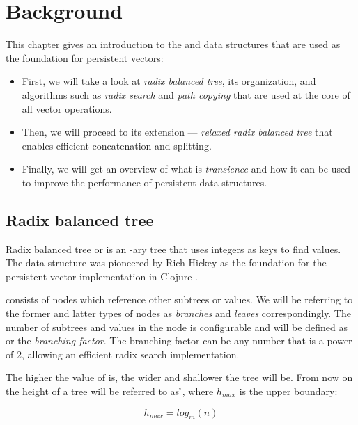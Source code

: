 \chapter{Background}

This chapter gives an introduction to the \treerb{} and \treerrb{} data structures that are used as the foundation for persistent vectors:

\begin{itemize}
    \item First, we will take a look at \emph{radix balanced tree}, its organization, and algorithms such as \emph{radix search} and \emph{path copying} that are used at the core of all vector operations.
    \item Then, we will proceed to its extension --- \emph{relaxed radix balanced tree} that enables efficient concatenation and splitting.
    \item Finally, we will get an overview of what is \emph{transience} and how it can be used to improve the performance of persistent data structures.
\end{itemize}

\section{Radix balanced tree}
\label{chapter:radix-balanced-tree}

Radix balanced tree or \treerb{} is an \m{}-ary tree that uses integers as keys to find values. The data structure was pioneered by Rich Hickey as the foundation for the persistent vector implementation in Clojure \cite{the-clojure-programming-language}.

\treerb{} consists of nodes which reference other subtrees or values. We will be referring to the former and latter types of nodes as \emph{branches} and \emph{leaves} correspondingly. The number of subtrees and values in the node is configurable and will be defined as \m{} or the \emph{branching factor}. The branching factor can be any number that is a power of 2, allowing an efficient radix search implementation.

The higher the value of \m{} is, the wider and shallower the tree will be. From now on the height of a tree will be referred to as \h{}, where $h_{max}$ is the upper boundary:

\begin{equation}
    \label{eq:h-max}
    h_{max} = log_m(n)
\end{equation}


